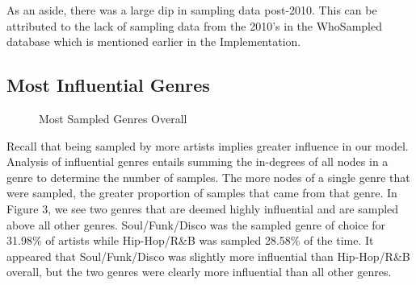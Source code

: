 \documentclass[pageno]{jpaper}
\begin{document}
As an aside, there was a large dip in sampling data post-2010. This can be attributed to the lack of sampling data from the 2010's in the WhoSampled database which is mentioned earlier in the Implementation.
\subsection{Most Influential Genres}
\begin{figure}[H]
\caption{Most Sampled Genres Overall}
\label{fig:fig3}
\centering
\end{figure}
Recall that being sampled by more artists implies greater influence in our model. Analysis of influential genres entails summing the in-degrees of all nodes in a genre to determine the number of samples. The more nodes of a single genre that were sampled, the greater proportion of samples that came from that genre. In Figure 3, we see two genres that are deemed highly influential and are sampled above all other genres. Soul/Funk/Disco was the sampled genre of choice for 31.98\% of artists while Hip-Hop/R\&B was sampled 28.58\% of the time. It appeared that Soul/Funk/Disco was slightly more influential than Hip-Hop/R\&B overall, but the two genres were clearly more influential than all other genres.
\end{document}

